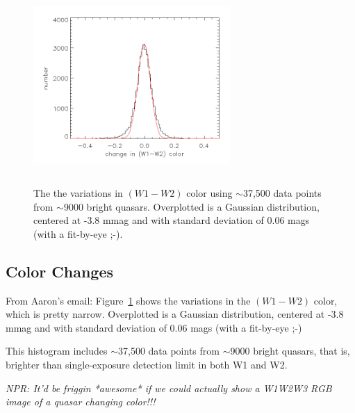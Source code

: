 \documentclass{emulateapj}
\begin{document}
    \begin{figure}
      \includegraphics[width=7.50cm, height=7.50cm, 
      trim=0.0cm 0.0cm 0.0cm 0.0cm, clip]
      {w1w2_color_variation.png}
      \centering
      \caption[]{The the variations in $(W1-W2)$ color using
        $\sim$37,500 data points from $\sim$9000 bright quasars.
        Overplotted is a Gaussian distribution, centered at -3.8 mmag 
        and with standard deviation of 0.06 mags (with a fit-by-eye ;-).}
      \label{fig:w1w2_color_variation}
    \end{figure}
    \subsection{Color Changes}
    From Aaron's email:
    Figure~\ref{fig:w1w2_color_variation} shows the variations in the
    $(W1-W2)$ color, which is pretty narrow. Overplotted is a Gaussian
    distribution, centered at -3.8 mmag and with standard deviation of
    0.06 mags (with a fit-by-eye ;-)
    
    This histogram includes $\sim$37,500 data points from $\sim$9000
    bright quasars, that is, brighter than single-exposure detection limit in both
    W1 and W2. 

    {\it NPR: It'd be friggin *awesome* if we could actually show a
      W1W2W3 RGB image of a quasar changing color!!!}
\end{document}
